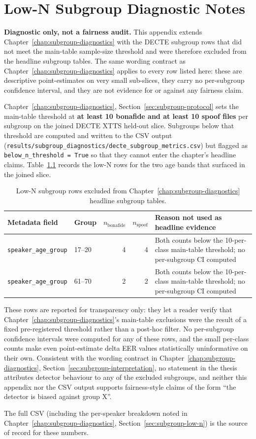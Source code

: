 \cleardoubleoddpage
\chapter{Low-N Subgroup Diagnostic Notes}
\label{app:low-n-subgroups}

\textbf{Diagnostic only, not a fairness audit.} This appendix
extends Chapter~\ref{chap:subgroup-diagnostics} with the DECTE subgroup rows that
did not meet the main-table sample-size threshold and were therefore
excluded from the headline subgroup tables. The same wording contract
as Chapter~\ref{chap:subgroup-diagnostics} applies to every row listed here:
these are descriptive point-estimates on very small sub-slices, they
carry no per-subgroup confidence interval, and they are not evidence
for or against any fairness claim.

Chapter~\ref{chap:subgroup-diagnostics}, Section~\ref{sec:subgroup-protocol} sets the main-table
threshold at \textbf{at least 10 bonafide and at least 10 spoof files}
per subgroup on the joined DECTE XTTS held-out slice. Subgroups
below that threshold are computed and written to the CSV output
(\texttt{results/}\allowbreak\texttt{subgroup\_diagnostics/}\allowbreak\texttt{decte\_subgroup\_metrics.csv})
but flagged as \texttt{below\_n\_threshold = True} so that they cannot
enter the chapter's headline claims. Table~\ref{tab:appendix-low-n-subgroups}
records the low-N rows for the two age bands that surfaced in the
joined slice.

\begin{table}[t]
\centering
\caption{Low-N subgroup rows excluded from Chapter~\ref{chap:subgroup-diagnostics} headline subgroup tables.}
\label{tab:appendix-low-n-subgroups}
\small
\setlength{\tabcolsep}{5pt}
\begin{tabularx}{\linewidth}{@{}l l r r X@{}}
\toprule
\textbf{Metadata field} & \textbf{Group} & \textbf{$n_\text{bonafide}$} & \textbf{$n_\text{spoof}$} & \textbf{Reason not used as headline evidence} \\
\midrule
\texttt{speaker\_age\_group} & 17--20 & 4 & 4 & Both counts below the 10-per-class main-table threshold; no per-subgroup CI computed \\
\texttt{speaker\_age\_group} & 61--70 & 2 & 2 & Both counts below the 10-per-class main-table threshold; no per-subgroup CI computed \\
\bottomrule
\end{tabularx}
\end{table}

These rows are reported for transparency only: they let a reader
verify that Chapter~\ref{chap:subgroup-diagnostics}'s main-table exclusions were the
result of a fixed pre-registered threshold rather than a
post-hoc filter. No per-subgroup confidence intervals were computed
for any of these rows, and the small per-class counts make even
point-estimate delta EER values statistically uninformative on their
own. Consistent with the wording contract in Chapter~\ref{chap:subgroup-diagnostics},
Section~\ref{sec:subgroup-interpretation}, no statement in the thesis attributes
detector behaviour to any of the excluded subgroups, and neither
this appendix nor the CSV output supports fairness-style claims of
the form ``the detector is biased against group X''.

The full CSV (including the per-speaker breakdown noted in
Chapter~\ref{chap:subgroup-diagnostics}, Section~\ref{sec:subgroup-low-n}) is the source of record for
these numbers.
